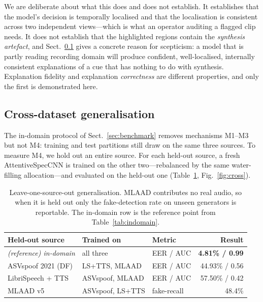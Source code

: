 \documentclass[sn-mathphys-num,pdflatex]{sn-jnl}
\begin{document}
We are deliberate about what this does and does not establish. It establishes
that the model's decision is temporally localised and that the localisation is
consistent across two independent views---which is what an operator auditing a
flagged clip needs. It does not establish that the highlighted regions contain
the \emph{synthesis artefact}, and Sect.~\ref{sec:loso} gives a concrete reason
for scepticism: a model that is partly reading recording domain will produce
confident, well-localised, internally consistent explanations of a cue that has
nothing to do with synthesis. Explanation fidelity and explanation
\emph{correctness} are different properties, and only the first is demonstrated
here.

\subsection{Cross-dataset generalisation}\label{sec:loso}

The in-domain protocol of Sect.~\ref{sec:benchmark} removes mechanisms M1--M3
but not M4: training and test partitions still draw on the same three sources.
To measure M4, we hold out an entire source. For each held-out source, a fresh
AttentiveSpecCNN is trained on the other two---rebalanced by the same
water-filling allocation---and evaluated on the held-out one
(Table~\ref{tab:cross}, Fig.~\ref{fig:cross}).

\begin{table}[t]
\centering
\caption{Leave-one-source-out generalisation. MLAAD contributes no real audio,
so when it is held out only the fake-detection rate on unseen generators is
reportable. The in-domain row is the reference point from
Table~\ref{tab:indomain}.}
\label{tab:cross}
\small\setlength{\tabcolsep}{5pt}
\begin{tabular}{@{}lllr@{}}
\toprule
Held-out source & Trained on & Metric & Result \\
\midrule
\emph{(reference) in-domain} & all three  & EER / AUC   & \textbf{4.81\% / 0.99} \\
ASVspoof 2021 (DF)           & LS+TTS, MLAAD & EER / AUC & 44.93\% / 0.56 \\
LibriSpeech + TTS            & ASVspoof, MLAAD & EER / AUC & 57.50\% / 0.42 \\
MLAAD v5                     & ASVspoof, LS+TTS & fake-recall & 48.4\% \\
\bottomrule
\end{tabular}
\end{table}
\end{document}
